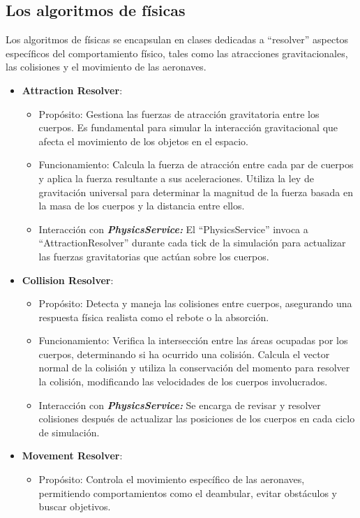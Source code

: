 \subsection{Los algoritmos de físicas}
Los algoritmos de físicas se encapsulan en clases dedicadas a ``resolver'' aspectos específicos del comportamiento físico, tales como las atracciones gravitacionales, las colisiones y el movimiento de las aeronaves.
\begin{itemize}
    \item \textbf{Attraction Resolver}:
    \begin{itemize}
        \item Propósito: Gestiona las fuerzas de atracción gravitatoria entre los cuerpos. Es fundamental para simular la interacción gravitacional que afecta el movimiento de los objetos en el espacio.
        \item Funcionamiento: Calcula la fuerza de atracción entre cada par de cuerpos y aplica la fuerza resultante a sus aceleraciones. Utiliza la ley de gravitación universal para determinar la magnitud de la fuerza basada en la masa de los cuerpos y la distancia entre ellos.
        \item Interacción con \textbf{\textit{PhysicsService:}} El ``PhysicsService'' invoca a ``AttractionResolver'' durante cada tick de la simulación para actualizar las fuerzas gravitatorias que actúan sobre los cuerpos.
    \end{itemize}
    \item \textbf{Collision Resolver}:
    \begin{itemize}
        \item Propósito: Detecta y maneja las colisiones entre cuerpos, asegurando una respuesta física realista como el rebote o la absorción.
        \item Funcionamiento: Verifica la intersección entre las áreas ocupadas por los cuerpos, determinando si ha ocurrido una colisión. Calcula el vector normal de la colisión y utiliza la conservación del momento para resolver la colisión, modificando las velocidades de los cuerpos involucrados.
        \item Interacción con \textbf{\textit{PhysicsService:}} Se encarga de revisar y resolver colisiones después de actualizar las posiciones de los cuerpos en cada ciclo de simulación.
    \end{itemize}
    \item \textbf{Movement Resolver}: 
    \begin{itemize}
        \item Propósito: Controla el movimiento específico de las aeronaves, permitiendo comportamientos como el deambular, evitar obstáculos y buscar objetivos.

\end{itemize}
\end{itemize}
